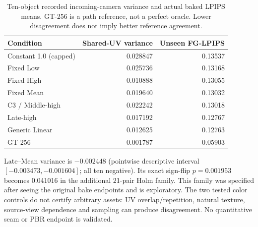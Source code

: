 \documentclass[11pt]{article}
\begin{document}
\begin{table}[ht]\centering\small
\caption{Ten-object recorded incoming-camera variance and actual baked LPIPS means. GT-256 is a path reference, not a perfect oracle. Lower disagreement does not imply better reference agreement.}\label{tab:cross-view015}
\begin{tabular}{lrr}\toprule Condition & Shared-UV variance & Unseen FG-LPIPS \\
\midrule
Constant 1.0 (capped) & 0.028847 & 0.13537 \\
Fixed Low & 0.025736 & 0.13168 \\
Fixed High & 0.010888 & 0.13055 \\
Fixed Mean & 0.019640 & 0.13032 \\
C3 / Middle-high & 0.022242 & 0.13018 \\
Late-high & 0.017192 & 0.12767 \\
Generic Linear & 0.012625 & 0.12763 \\
GT-256 & 0.001787 & 0.05903 \\

\bottomrule\end{tabular}
\end{table}
Late--Mean variance is $-0.002448$ (pointwise descriptive interval $[-0.003473,-0.001604]$; all ten negative). Its exact sign-flip $p=0.001953$ becomes 0.041016 in the additional 21-pair Holm family. This family was specified after seeing the original bake endpoints and is exploratory. The two tested color controls do not certify arbitrary assets: UV overlap/repetition, natural texture, source-view dependence and sampling can produce disagreement. No quantitative seam or PBR endpoint is validated.
\end{document}
